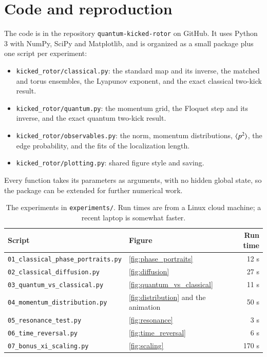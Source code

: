 \section{Code and reproduction}
\label{app:code}

The code is in the repository \texttt{quantum-kicked-rotor} on GitHub. It uses Python 3 with NumPy, SciPy and
Matplotlib, and is organized as a small package plus one script per experiment:
\begin{itemize}
  \item \texttt{kicked\_rotor/classical.py}: the standard map and its inverse, the matched and torus
  ensembles, the Lyapunov exponent, and the exact classical two-kick result.
  \item \texttt{kicked\_rotor/quantum.py}: the momentum grid, the Floquet step and its inverse, and the exact
  quantum two-kick result.
  \item \texttt{kicked\_rotor/observables.py}: the norm, momentum distributions, $\langle p^2 \rangle$, the edge
  probability, and the fits of the localization length.
  \item \texttt{kicked\_rotor/plotting.py}: shared figure style and saving.
\end{itemize}
Every function takes its parameters as arguments, with no hidden global state, so the package can be extended
for further numerical work.

\begin{table}[!htbp]
\centering
\small
\begin{tabular}{@{}llr@{}}
\toprule
Script & Figure & Run time \\
\midrule
\texttt{01\_classical\_phase\_portraits.py} & \cref{fig:phase_portraits} & 12 s \\
\texttt{02\_classical\_diffusion.py} & \cref{fig:diffusion} & 27 s \\
\texttt{03\_quantum\_vs\_classical.py} & \cref{fig:quantum_vs_classical} & 11 s \\
\texttt{04\_momentum\_distribution.py} & \cref{fig:distribution} and the animation & 50 s \\
\texttt{05\_resonance\_test.py} & \cref{fig:resonance} & 3 s \\
\texttt{06\_time\_reversal.py} & \cref{fig:time_reversal} & 6 s \\
\texttt{07\_bonus\_xi\_scaling.py} & \cref{fig:scaling} & 170 s \\
\bottomrule
\end{tabular}
\caption{The experiments in \texttt{experiments/}. Run times are from a Linux cloud machine; a recent laptop
is somewhat faster.}
\label{tab:experiments}
\end{table}

